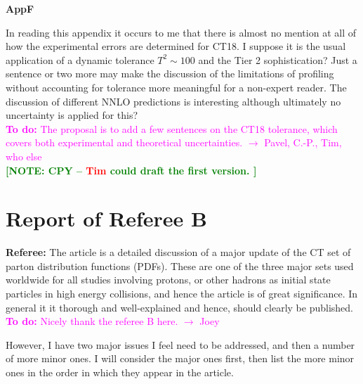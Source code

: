 \documentclass[aps,prd,amsmath,nofootinbib,floatfix,fleqn]{revtex4}
\newcommand{\TODO}[1]{\textcolor{magenta}{
\quad\vspace{3pt} \\ {\bf To do:} #1 \\
}}
\newcommand{\NOTECPY}[1]{\textcolor{green}{ \bf[NOTE: CPY -- #1 ]}}
\begin{document}
{\bf AppF}


In reading this appendix it occurs to me that there is almost no mention at all of how the experimental errors are determined for CT18. I suppose it is the usual application of a dynamic tolerance $T^2 \sim 100$ and the Tier 2 sophistication? Just a sentence or two more may make the discussion of the limitations of profiling without accounting for tolerance more meaningful for a non-expert reader. The discussion of different NNLO predictions is interesting although ultimately no uncertainty is applied for this?
\TODO{The proposal is to add a few sentences on the CT18 tolerance, which covers both experimental and theoretical uncertainties. $\to$ Pavel, C.-P., Tim, who else}
\NOTECPY{\textcolor{red}{Tim} could draft the first version.}

\section{Report of Referee B}
{\bf Referee:} 
The article is a detailed discussion of a major update of the CT set of parton
distribution functions (PDFs). These are one of the three major sets used
worldwide for all studies involving protons, or other hadrons as initial state
particles in high energy collisions, and hence the article is of great
significance. In general it it thorough and well-explained and hence, should
clearly be published. 
\TODO{Nicely thank the referee B here. $\to$ Joey}

However, I have two major issues I feel need to be
addressed, and then a number of more minor ones. I will consider the major ones
first, then list the more minor ones in the order in which they appear in the
article.
\end{document}
